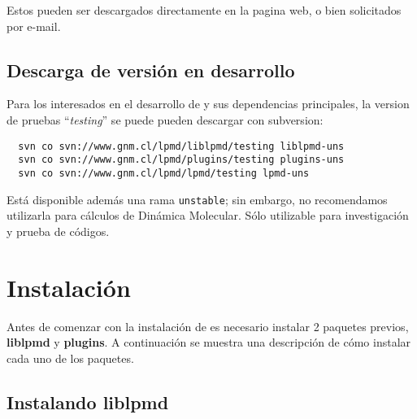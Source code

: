 Estos pueden ser descargados directamente en la pagina web, o bien solicitados por e-mail.

\subsection{Descarga de versi\'on en desarrollo}

Para los interesados en el desarrollo de \lpmd y sus dependencias principales, la version de pruebas ``\textit{testing}'' se puede pueden descargar con subversion:

\begin{center}
 \begin{verbatim}
  svn co svn://www.gnm.cl/lpmd/liblpmd/testing liblpmd-uns
  svn co svn://www.gnm.cl/lpmd/plugins/testing plugins-uns
  svn co svn://www.gnm.cl/lpmd/lpmd/testing lpmd-uns
 \end{verbatim}
\end{center}

Est\'a disponible adem\'as una rama \verb|unstable|; sin embargo, no recomendamos utilizarla para c\'alculos de Din\'amica Molecular. S\'olo utilizable para investigaci\'on y prueba de c\'odigos.

\section{Instalaci\'on}
Antes de comenzar con la instalaci\'on de \lpmd es necesario instalar 2 paquetes previos, \textbf{liblpmd} y \textbf{plugins}. A continuaci\'on se muestra una descripci\'on de c\'omo instalar cada uno de los paquetes.


\subsection{Instalando liblpmd}

% 
% 

